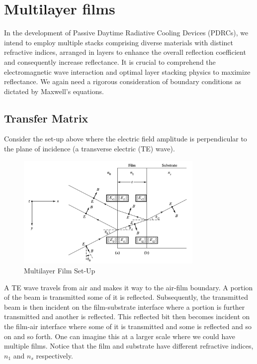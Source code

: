 \section{Multilayer films}
In the development of Passive Daytime Radiative Cooling Devices (PDRCs), we intend to employ multiple stacks comprising diverse materials with distinct refractive indices, arranged in layers to enhance the overall reflection coefficient and consequently increase reflectance. It is crucial to comprehend the electromagnetic wave interaction and optimal layer stacking physics to maximize reflectance. We again need a rigorous consideration of boundary conditions as dictated by Maxwell's equations. %

\subsection{Transfer Matrix}
Consider the set-up above where the electric field amplitude is perpendicular to the plane of incidence (a transverse electric (TE) wave).

\begin{figure}
  \centering
  \includegraphics[width=0.8\textwidth]{Chapters/Figures/Multilayer Film Set-Up.jpeg}
  \caption{Multilayer Film Set-Up}
\end{figure}

A TE wave travels from air and makes it way to the air-film boundary. A portion of the beam is transmitted some of it is reflected. Subsequently, the transmitted beam is then incident on the film-substrate interface where a portion is further transmitted and another is reflected. This reflected bit then becomes incident on the film-air interface where some of it is transmitted and some is reflected and so on and so forth. One can imagine this at a larger scale where we could have multiple films. Notice that the film and substrate have different refractive indices, $n_1$ and $n_s$ respectively.

